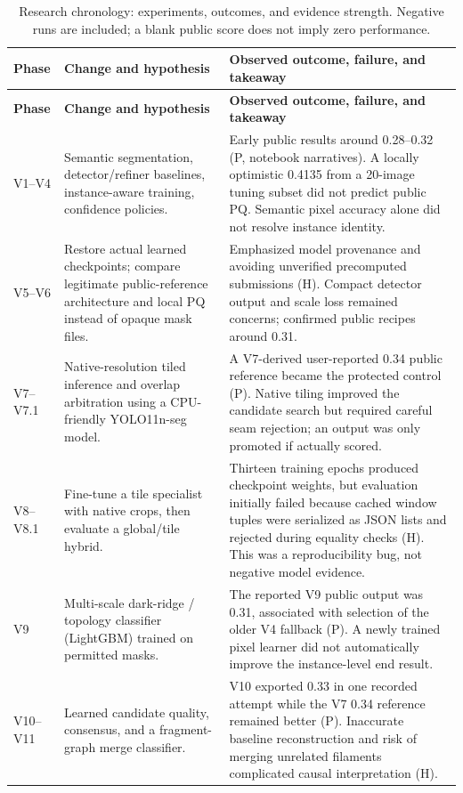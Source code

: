 \documentclass[11pt,a4paper]{article}
\begin{document}
\begin{longtable}{p{}p{}p{}}
\caption{Research chronology: experiments, outcomes, and evidence strength. Negative runs are included; a blank public score does not imply zero performance.}\label{tab:chronology}\\
\toprule \textbf{Phase} & \textbf{Change and hypothesis} & \textbf{Observed outcome, failure, and takeaway} \\ \midrule\endfirsthead
\toprule \textbf{Phase} & \textbf{Change and hypothesis} & \textbf{Observed outcome, failure, and takeaway} \\ \midrule\endhead
V1--V4 & Semantic segmentation, detector/refiner baselines, instance-aware training, confidence policies. & Early public results around 0.28--0.32 (P, notebook narratives). A locally optimistic 0.4135 from a 20-image tuning subset did not predict public PQ. Semantic pixel accuracy alone did not resolve instance identity.\\
V5--V6 & Restore actual learned checkpoints; compare legitimate public-reference architecture and local PQ instead of opaque mask files. & Emphasized model provenance and avoiding unverified precomputed submissions (H). Compact detector output and scale loss remained concerns; confirmed public recipes around 0.31.\\
V7--V7.1 & Native-resolution tiled inference and overlap arbitration using a CPU-friendly YOLO11n-seg model. & A V7-derived user-reported 0.34 public reference became the protected control (P). Native tiling improved the candidate search but required careful seam rejection; an output was only promoted if actually scored.\\
V8--V8.1 & Fine-tune a tile specialist with native crops, then evaluate a global/tile hybrid. & Thirteen training epochs produced checkpoint weights, but evaluation initially failed because cached window tuples were serialized as JSON lists and rejected during equality checks (H). This was a reproducibility bug, not negative model evidence.\\
V9 & Multi-scale dark-ridge / topology classifier (LightGBM) trained on permitted masks. & The reported V9 public output was 0.31, associated with selection of the older V4 fallback (P). A newly trained pixel learner did not automatically improve the instance-level end result.\\
V10--V11 & Learned candidate quality, consensus, and a fragment-graph merge classifier. & V10 exported 0.33 in one recorded attempt while the V7 0.34 reference remained better (P). Inaccurate baseline reconstruction and risk of merging unrelated filaments complicated causal interpretation (H).\\

\end{longtable}
\end{document}
